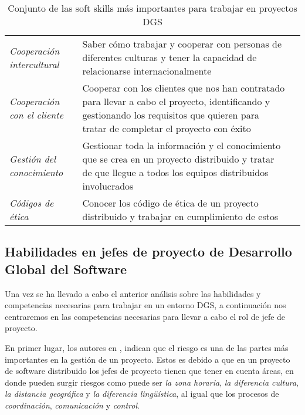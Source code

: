 \begin{table}[htbp]
{\begin{tabular}{lp{33.5em}c}
        \rowcolor[rgb]{ .949,  .949,  .949} \textit{Cooperación intercultural} & \cellcolor[rgb]{ 1,  1,  1}Saber cómo trabajar y cooperar con personas de diferentes culturas y tener la capacidad de relacionarse internacionalmente & \cellcolor[rgb]{ 1,  1,  1}\cite{bosnic2019assessing, paasivaara2013teaching, saldana2014skills} \\
        \rowcolor[rgb]{ .949,  .949,  .949} \textit{Cooperación con el cliente} & \cellcolor[rgb]{ 1,  1,  1}Cooperar con los clientes que nos han contratado para llevar a cabo el proyecto, identificando y gestionando los requisitos que quieren para tratar de completar el proyecto con éxito & \cellcolor[rgb]{ 1,  1,  1}\cite{bosnic2019assessing, damian2006instructional, saldana2014skills} \\
        \rowcolor[rgb]{ .949,  .949,  .949} \textit{Gestión del conocimiento} & \cellcolor[rgb]{ 1,  1,  1}Gestionar toda la información y el conocimiento que se crea en un proyecto distribuido y tratar de que llegue a todos los equipos distribuidos involucrados & \cellcolor[rgb]{ 1,  1,  1}\cite{saldana2014skills} \\
        \rowcolor[rgb]{ .949,  .949,  .949} \textit{Códigos de ética} & \cellcolor[rgb]{ 1,  1,  1}Conocer los código de ética de un proyecto distribuido y trabajar en \newline{}cumplimiento de estos & \cellcolor[rgb]{ 1,  1,  1}\cite{monasor2010training} \\
    \end{tabular}}
  \caption{Conjunto de las soft skills más importantes para trabajar en proyectos DGS}
  \label{tab:SoftSkillsDGS}
\end{table}


\subsection{Habilidades en jefes de proyecto de Desarrollo Global del Software}
\label{sec:HabilidadesJP}

Una vez se ha llevado a cabo el anterior análisis sobre las habilidades y competencias necesarias para trabajar en un entorno DGS, a continuación nos centraremos en las competencias necesarias para llevar a cabo el rol de jefe de proyecto.

En primer lugar, los autores en \cite{verner2014risks}, indican que el riesgo es una de las partes más importantes en la gestión de un proyecto. Estos es debido a que en un proyecto de software distribuido los jefes de proyecto tienen que tener en cuenta áreas, en donde pueden surgir riesgos como puede ser \emph{la zona horaria}, \emph{la diferencia cultura}, \emph{la distancia geográfica} y \emph{la diferencia lingüística}, al igual que los procesos de \emph{coordinación}, \emph{comunicación} y \emph{control}.

